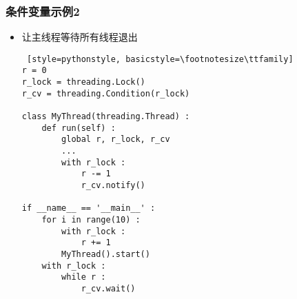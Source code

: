 \begin{CJK}{UTF8}{gbsn}
\begin{frame} [fragile]
	\frametitle{条件变量示例2}
	\begin{itemize}
	\item 让主线程等待所有线程退出
	\begin{lstlisting} [style=pythonstyle, basicstyle=\footnotesize\ttfamily]
r = 0
r_lock = threading.Lock()
r_cv = threading.Condition(r_lock)

class MyThread(threading.Thread) :
	def run(self) :
		global r, r_lock, r_cv
		...
		with r_lock :
			r -= 1
			r_cv.notify()

if __name__ == '__main__' :
	for i in range(10) :
		with r_lock :
			r += 1
		MyThread().start()
	with r_lock :
		while r :
			r_cv.wait()
	\end{lstlisting}
	\end{itemize}
\end{frame}

\begin{comment}
import threading

s = 0
s_lock = threading.Lock()
r = 0
r_lock = threading.Lock()
r_cv = threading.Condition(r_lock)

class MyThread(threading.Thread) :
	def run(self) :
		global s, s_lock, r, r_lock, r_cv
		for i in range(100000) :
			s_lock.acquire()
			s += 1
			s_lock.release()
		with r_lock :
			r -= 1
			r_cv.notify()

if __name__ == '__main__' :
	for i in range(10) :
		with r_lock :
			r += 1
		MyThread().start()
	with r_lock :
		while r :
			r_cv.wait()
	print(s)
\end{comment}


\end{CJK}
